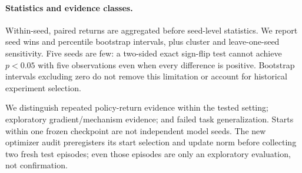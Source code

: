 \paragraph{Statistics and evidence classes.}
Within-seed, paired returns are aggregated before seed-level statistics. We report seed wins and percentile bootstrap intervals, plus cluster and leave-one-seed sensitivity. Five seeds are few: a two-sided exact sign-flip test cannot achieve $p<0.05$ with five observations even when every difference is positive. Bootstrap intervals excluding zero do not remove this limitation or account for historical experiment selection.

We distinguish repeated policy-return evidence within the tested setting; exploratory gradient/mechanism evidence; and failed task generalization. Starts within one frozen checkpoint are not independent model seeds. The new optimizer audit preregisters its start selection and update norm before collecting two fresh test episodes; even those episodes are only an exploratory evaluation, not confirmation.
